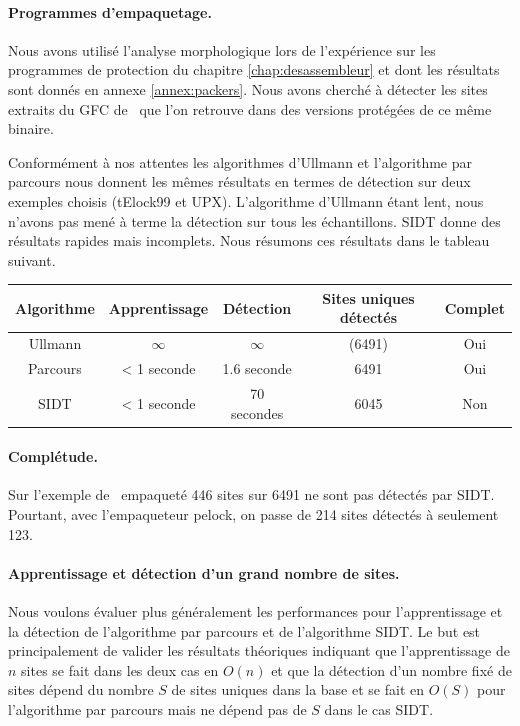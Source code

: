 \paragraph{Programmes d'empaquetage.}
Nous avons utilisé l'analyse morphologique lors de l'expérience sur les programmes de protection du chapitre \ref{chap:desassembleur} et dont les résultats sont donnés en annexe \ref{annex:packers}.
Nous avons cherché à détecter les sites extraits du GFC de \hostname\ que l'on retrouve dans des versions protégées de ce même binaire.

Conformément à nos attentes les algorithmes d'Ullmann et l'algorithme par parcours nous donnent les mêmes résultats en termes de détection sur deux exemples choisis (tElock99 et UPX). L'algorithme d'Ullmann étant lent, nous n'avons pas mené à terme la détection sur tous les échantillons.
SIDT donne des résultats rapides mais incomplets. Nous résumons ces résultats dans le tableau suivant.

\begin{center}
\begin{tabular}{|c|c|c|c|c|}
\hline
 Algorithme & Apprentissage & Détection & Sites uniques détectés & Complet \\
 \hline
 Ullmann & $\infty$ & $\infty$ & (6491) & Oui\\
 Parcours & < 1 seconde & 1.6 seconde & 6491 & Oui\\
 SIDT & < 1 seconde & 70 secondes & 6045 & Non\\
 \hline
\end{tabular}
\end{center}

\paragraph{Complétude.}
Sur l'exemple de \hostname\ empaqueté 446 sites sur 6491 ne sont pas détectés par SIDT.
Pourtant, avec l'empaqueteur pelock, on passe de 214 sites détectés à seulement 123.


\paragraph{Apprentissage et détection d'un grand nombre de sites.}
Nous voulons évaluer plus généralement les performances pour l'apprentissage et la détection de l'algorithme par parcours et de l'algorithme SIDT.
Le but est principalement de valider les résultats théoriques indiquant que l'apprentissage de $n$ sites se fait dans les deux cas en $O(n)$ et que la détection d'un nombre fixé de sites dépend du nombre $S$ de sites uniques dans la base et se fait en $O(S)$ pour l'algorithme par parcours mais ne dépend pas de $S$ dans le cas SIDT.

